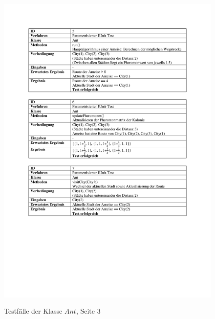 \begin{appendices}
\begin{figure}[h]
		\includegraphics[width=\linewidth]{images/Testfaelle_Ant_Seite_2.pdf}
		\label{testAnt2}
	\end{figure}
	\begin{figure}[h]
		\centering
		\caption{Testfälle der Klasse $Ant$, Seite 3}

\end{figure}
\end{appendices}
